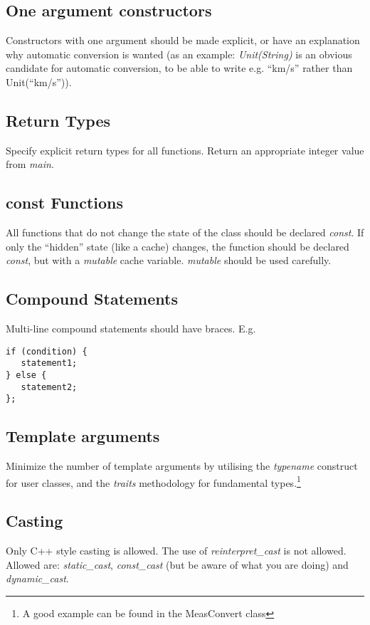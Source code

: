 \subsection {One argument constructors} \bmar Constructors with one argument should
be made explicit, or have an explanation why automatic conversion is wanted
(as an example: {\it Unit(String)} is an obvious candidate for automatic
conversion, to be able to write e.g. ``km/s'' rather than Unit(``km/s'')).
\subsection {Return Types} 
Specify explicit return types for all functions.  Return an appropriate
integer value from {\em main}.
\subsection {const Functions} \bmar
All functions that do not change the state of
the class should be declared {\it const}. If only the ``hidden'' state (like
a cache) changes, the function should be declared {\it const}, but with a
{\it mutable} cache variable. {\it mutable} should be used carefully.
\subsection {Compound Statements} Multi-line compound statements should have
braces. \bmar E.g.
\begin{verbatim}
if (condition) {
   statement1;
} else {
   statement2;
};
\end{verbatim}
\subsection {Template arguments} \bmar 
Minimize the number of template arguments by
   utilising the {\it typename} construct for user classes, and the {\it
   traits} methodology for fundamental types.\footnote { A good example can
   be found in the MeasConvert class}
\subsection {Casting} \bmar
Only C++ style casting is allowed. The use of
   {\em reinterpret\_cast} is not allowed. Allowed are: {\em static\_cast},
   {\em const\_cast} (but be aware of what you are doing) and {\em
   dynamic\_cast}. 
